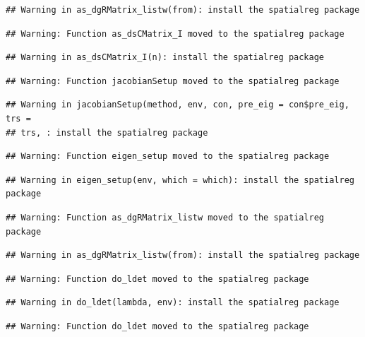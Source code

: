 \documentclass[11pt,]{article}
\begin{document}
\begin{verbatim}
## Warning in as_dgRMatrix_listw(from): install the spatialreg package
\end{verbatim}

\begin{verbatim}
## Warning: Function as_dsCMatrix_I moved to the spatialreg package
\end{verbatim}

\begin{verbatim}
## Warning in as_dsCMatrix_I(n): install the spatialreg package
\end{verbatim}

\begin{verbatim}
## Warning: Function jacobianSetup moved to the spatialreg package
\end{verbatim}

\begin{verbatim}
## Warning in jacobianSetup(method, env, con, pre_eig = con$pre_eig, trs =
## trs, : install the spatialreg package
\end{verbatim}

\begin{verbatim}
## Warning: Function eigen_setup moved to the spatialreg package
\end{verbatim}

\begin{verbatim}
## Warning in eigen_setup(env, which = which): install the spatialreg package
\end{verbatim}

\begin{verbatim}
## Warning: Function as_dgRMatrix_listw moved to the spatialreg package
\end{verbatim}

\begin{verbatim}
## Warning in as_dgRMatrix_listw(from): install the spatialreg package
\end{verbatim}

\begin{verbatim}
## Warning: Function do_ldet moved to the spatialreg package
\end{verbatim}

\begin{verbatim}
## Warning in do_ldet(lambda, env): install the spatialreg package
\end{verbatim}

\begin{verbatim}
## Warning: Function do_ldet moved to the spatialreg package
\end{verbatim}
\end{document}
